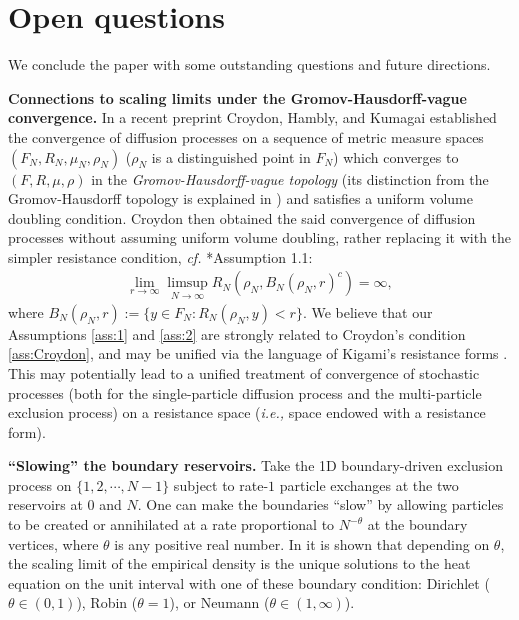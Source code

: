 \documentclass[11pt]{amsart}
\theoremstyle{plain}
\theoremstyle{definition}
\theoremstyle{remark}
\begin{document}
\section{Open questions} \label{sec:open}

We conclude the paper with some outstanding questions and future directions.

\textbf{Connections to scaling limits under the Gromov-Hausdorff-vague convergence.} In a recent preprint \cite{CHK16} Croydon, Hambly, and Kumagai established the convergence of diffusion processes on a sequence of metric measure spaces $(F_N, R_N, \mu_N, \rho_N)$ ($\rho_N$ is a distinguished point in $F_N$) which converges to $(F,R,\mu,\rho)$ in the \emph{Gromov-Hausdorff-vague topology} (its distinction from the Gromov-Hausdorff topology is explained in \cite{ALW16}) and satisfies a uniform volume doubling condition. Croydon \cite{Croydon} then obtained the said convergence of diffusion processes without assuming uniform volume doubling, rather replacing it with the simpler resistance condition, \emph{cf.\@} \cite{Croydon}*{Assumption 1.1}:
\begin{align}
\label{ass:Croydon}
\lim_{r\to\infty} \limsup_{N\to\infty} R_N(\rho_N, B_N(\rho_N, r)^c) =\infty,
\end{align}
where $B_N(\rho_N, r) := \{y\in F_N: R_N(\rho_N,y)<r\}$.
We believe that our Assumptions \ref{ass:1} and \ref{ass:2} are strongly related to Croydon's condition \eqref{ass:Croydon}, and may be unified via the language of Kigami's resistance forms \cites{KigamiRF,KigamiMemoir}. This may potentially lead to a unified treatment of convergence of stochastic processes (both for the single-particle diffusion process and the multi-particle exclusion process) on a resistance space (\emph{i.e.,} space endowed with a resistance form).

\textbf{``Slowing'' the boundary reservoirs.} Take the 1D boundary-driven exclusion process on $\{1,2,\cdots, N-1\}$ subject to rate-$1$ particle exchanges at the two reservoirs at $0$ and $N$. One can make the boundaries ``slow'' by allowing particles to be created or annihilated at a rate proportional to $N^{-\theta}$ at the boundary vertices, where $\theta$ is any positive real number. In \cite{BMNS} it is shown that depending on $\theta$, the scaling limit of the empirical density is the unique solutions to the heat equation on the unit interval with one of these boundary condition: Dirichlet ($\theta\in (0,1)$), Robin ($\theta =1$), or Neumann ($\theta \in (1,\infty)$). 
\end{document}
